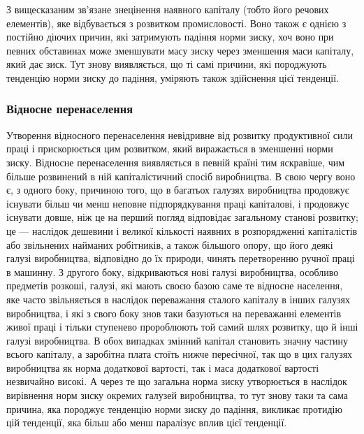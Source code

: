 
З вищесказаним зв’язане знецінення наявного капіталу (тобто його речових елементів), яке
відбувається з розвитком промисловості. Воно також є однією з постійно діючих причин, які затримують
падіння норми зиску, хоч воно при певних обставинах може зменшувати масу зиску через зменшення маси
капіталу, який дає зиск. Тут знову виявляється, що ті самі причини, які породжують тенденцію норми
зиску до падіння, уміряють також здійснення цієї тенденції.

\subsubsection{Відносне перенаселення}
Утворення відносного перенаселення невідривне від розвитку продуктивної сили праці і прискорюється
цим розвитком, який виражається в зменшенні норми зиску. Відносне перенаселення виявляється в певній
країні тим яскравіше, чим більше розвинений в ній капіталістичний спосіб виробництва. В свою чергу
воно є, з одного боку, причиною того, що в багатьох галузях виробництва продовжує існувати більш чи
менш неповне підпорядкування праці капіталові, і продовжує існувати довше, ніж це на перший погляд
відповідає загальному станові розвитку; це — наслідок дешевини і великої кількості наявних в
розпорядженні капіталістів або звільнених найманих робітників, а також більшого опору, що його деякі
галузі виробництва, відповідно до
їх природи, чинять перетворенню ручної праці в машинну. З другого боку, відкриваються нові галузі
виробництва, особливо предметів розкоші, галузі, які мають своєю базою саме те відносне населення,
яке часто звільняється в наслідок переважання сталого капіталу в інших галузях виробництва, і які з
свого боку знов таки базуються на переважанні елементів живої праці і тільки ступенево пророблюють
той самий шлях розвитку, що й інші галузі виробництва. В обох випадках змінний капітал становить
значну частину всього капіталу, а заробітна плата стоїть нижче пересічної, так що в цих галузях
виробництва як норма додаткової вартості, так і маса додаткової вартості незвичайно високі. А через
те що загальна норма зиску утворюється в наслідок вирівнення норм зиску окремих галузей виробництва,
то
тут знову таки та сама причина, яка породжує тенденцію норми зиску до падіння, викликає протидію цій
тенденції, яка більш або менш паралізує вплив цієї тенденції.

